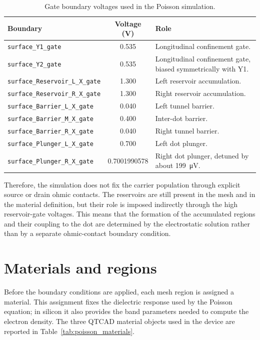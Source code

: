 \begin{table}[H]
\centering
\begin{tabular}{|>{\raggedright\arraybackslash}p{5.5cm}|c|>{\raggedright\arraybackslash}p{6.1cm}|}
\hline
Boundary & Voltage (V) & Role \\
\hline
\texttt{surface\_Y1\_gate} & 0.535 & Longitudinal confinement gate. \\
\hline
\texttt{surface\_Y2\_gate} & 0.535 & Longitudinal confinement gate, biased symmetrically with Y1. \\
\hline
\texttt{surface\_Reservoir\_L\_X\_gate} & 1.300 & Left reservoir accumulation. \\
\hline
\texttt{surface\_Reservoir\_R\_X\_gate} & 1.300 & Right reservoir accumulation. \\
\hline
\texttt{surface\_Barrier\_L\_X\_gate} & 0.040 & Left tunnel barrier. \\
\hline
\texttt{surface\_Barrier\_M\_X\_gate} & 0.400 & Inter-dot barrier. \\
\hline
\texttt{surface\_Barrier\_R\_X\_gate} & 0.040 & Right tunnel barrier. \\
\hline
\texttt{surface\_Plunger\_L\_X\_gate} & 0.700 & Left dot plunger. \\
\hline
\texttt{surface\_Plunger\_R\_X\_gate} & 0.7001990578 & Right dot plunger, detuned by about \SI{199}{\micro\volt}. \\
\hline
\end{tabular}
\caption{Gate boundary voltages used in the Poisson simulation.}
\label{tab:poisson_voltages}
\end{table}

Therefore, the simulation does not fix the carrier population through explicit
source or drain ohmic contacts. The reservoirs are still present in the mesh
and in the material definition, but their role is imposed indirectly through
the high reservoir-gate voltages. This means that the formation of the
accumulated regions and their coupling to the dot are determined by the
electrostatic solution rather than by a separate ohmic-contact boundary
condition.

\section{Materials and regions}

Before the boundary conditions are applied, each mesh region is assigned a
material. This assignment fixes the dielectric response used by the Poisson
equation; in silicon it also provides the band parameters needed to compute the
electron density. The three QTCAD material objects used in the device are
reported in Table~\ref{tab:poisson_materials}.

